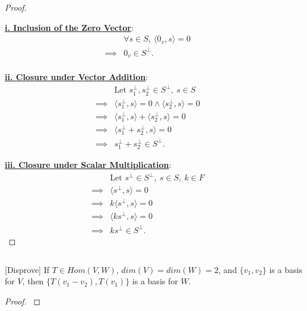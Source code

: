 \documentclass{article}
\newenvironment{customthm}[1]
  {\renewcommand\theinnercustomthm{#1}\innercustomthm}
  {\endinnercustomthm}
\begin{document}
\begin{proof}
  $ $

  \textbf{\underline{i. Inclusion of the Zero Vector}}:
  \begin{align*}
   & \forall s \in S, \: 
   \langle
    0_v, s
   \rangle 
  = 0 &&\\
  \implies & 0_v \in S^\perp. &&\\
  \end{align*}


  \textbf{\underline{ii. Closure under Vector Addition}}:
  \begin{align*}
    & \text{Let } s^\perp_1, s^\perp_2 \in S^\perp, \: s \in S &&\\
    \implies & 
    \langle
      s^\perp_1, s
    \rangle
    = 0
    \land
    \langle
      s^\perp_2, s
    \rangle
    = 0 &&\\
    \implies &
    \langle
      s^\perp_1, s
    \rangle
    +
    \langle
      s^\perp_2, s
    \rangle
    = 0 &&\\
    \implies & 
    \langle
      s^\perp_1 + s^\perp_2, s
    \rangle
    = 0 &&\\
    \implies & s^\perp_1 + s^\perp_2 \in S^\perp.
  \end{align*}


  \textbf{\underline{iii. Closure under Scalar Multiplication}}:
  \begin{align*}
    & \text{Let } s^\perp \in S^\perp, \: s \in S, \: k \in F &&\\
    \implies &
    \langle
      s^\perp, s
    \rangle
    = 0 &&\\
    \implies &
    k\langle
      s^\perp, s
    \rangle
    = 0 &&\\
    \implies &
    \langle
      ks^\perp, s
    \rangle
    = 0 &&\\
    \implies & ks^\perp \in S^\perp.
  \end{align*}
  


\end{proof}
\newpage


\begin{customthm}{19}[2021.F(1.A.ii)]
  $ $

  [Disprove] If $T \in Hom(V, W)$, $dim(V)=dim(W)=2$, and $\{ v_1, v_2 \}$ is a basis for $V$, then $\{ T(v_1-v_2), T(v_1)\}$ is a basis for $W$.
\end{customthm}

\begin{proof}
  $ $

  


\end{proof}
\newpage
\end{document}
